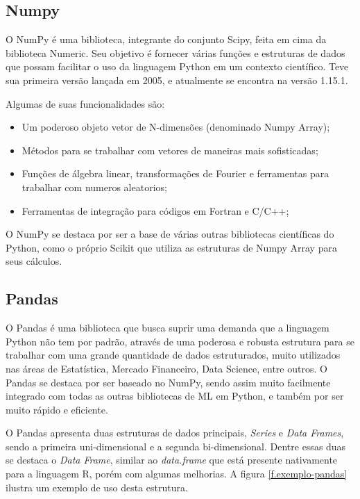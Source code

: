 \subsection{Numpy}
\label{ss.numpy}

O NumPy é uma biblioteca, integrante do conjunto Scipy, feita em cima da biblioteca Numeric. Seu objetivo é fornecer várias funções e estruturas de dados que possam facilitar o uso da linguagem Python em um contexto científico. Teve sua primeira versão lançada em 2005, e atualmente se encontra na versão 1.15.1. \cite{numpy}

Algumas de suas funcionalidades são:

\begin{itemize}
  \item  Um poderoso objeto vetor de N-dimensões (denominado Numpy Array);
  \item Métodos para se trabalhar com vetores de maneiras mais sofisticadas;
  \item Funções de álgebra linear, transformações de Fourier e ferramentas para trabalhar com numeros aleatorios;
  \item Ferramentas de integração para códigos em Fortran e C/C++;
\end{itemize}

O NumPy se destaca por ser a base de várias outras bibliotecas científicas do Python, como o próprio Scikit que utiliza as estruturas de Numpy Array para seus cálculos.  

\subsection{Pandas}
\label{ss.pandas}

O Pandas é uma biblioteca que busca suprir uma demanda que a linguagem Python não tem por padrão, através de uma poderosa e robusta estrutura para se trabalhar com uma grande quantidade de dados estruturados, muito utilizados nas áreas de Estatística, Mercado Financeiro, Data Science, entre outros. \cite{pandas-article} O Pandas se destaca por ser baseado no NumPy, sendo assim muito facilmente integrado com todas as outras bibliotecas de ML em Python, e também por ser muito rápido e eficiente.

O Pandas apresenta duas estruturas de dados principais, \textit{Series} e \textit{Data Frames}, sendo a primeira uni-dimensional e a segunda bi-dimensional. Dentre essas duas se destaca o \textit{Data Frame}, similar ao \textit{data.frame} que está presente nativamente para a linguagem R, porém com algumas melhorias. A figura \ref{f.exemplo-pandas} ilustra um exemplo de uso desta estrutura.

